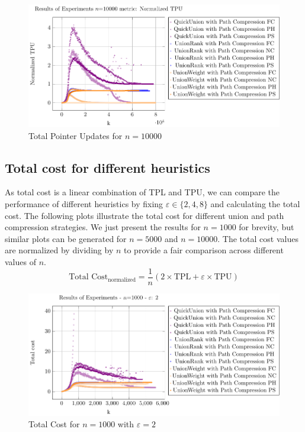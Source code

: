 \documentclass[10pt,a4paper,hidelinks]{article}
\begin{document}
\begin{figure}[h!]
    \centering
    \includegraphics[width=0.80\linewidth]{plots/plot_10000_Normalized TPU.pdf}
    \caption{Total Pointer Updates for $n = 10000$}
\end{figure}

\newpage

\subsection{Total cost for different heuristics}
As total cost is a linear combination of TPL and TPU, we can compare the performance of different heuristics by fixing $\varepsilon \in \{2, 4, 8\}$ and calculating the total cost. The following plots illustrate the total cost for different union and path compression strategies. We just present the results for $n = 1000$ for brevity, but similar plots can be generated for $n = 5000$ and $n = 10000$. The total cost values are normalized by dividing by $n$ to provide a fair comparison across different values of $n$.
$$\boxed{\text{Total Cost}_{\text{normalized}} = \dfrac{1}{n}\left(2\times\text{TPL} + \varepsilon \times \text{TPU}\right)}$$

\begin{figure}[h!]
    \centering
    \includegraphics[width=0.80\linewidth]{plots/plot_1000_Total_cost_epsilon_2.pdf}
    \caption{Total Cost for $n = 1000$ with $\varepsilon = 2$}
\end{figure}
\end{document}
